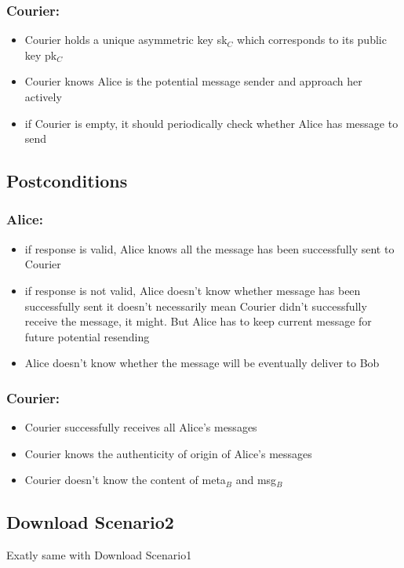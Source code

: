 \documentclass{article}
\begin{document}
\subsubsection*{Courier:}
\begin{itemize}
\item Courier holds a unique asymmetric key sk$_C$ which corresponds to its public key pk$_C$
\item Courier knows Alice is the potential message sender and approach her actively
\item if Courier is empty, it should periodically check whether Alice has message to send
\end{itemize}

\subsection*{Postconditions}
\subsubsection*{Alice:}
\begin{itemize}
\item if response is valid, Alice knows all the message has been successfully sent to Courier
\item if response is not valid, Alice doesn't know whether message has been successfully sent
\newline 
it doesn't necessarily mean Courier didn't successfully receive the message, it might. But Alice has to keep current message for future potential resending
\item Alice doesn't know whether the message will be eventually deliver to Bob
\end{itemize}

\subsubsection*{Courier:}
\begin{itemize}
\item Courier successfully receives all Alice's messages
\item Courier knows the authenticity of origin of Alice's messages
\item Courier doesn't know the content of meta$_B$ and msg$_B$
\end{itemize}
\vspace{40pt}


\subsection*{Download Scenario2}
Exatly same with Download Scenario1
\vspace{40pt}
\end{document}
